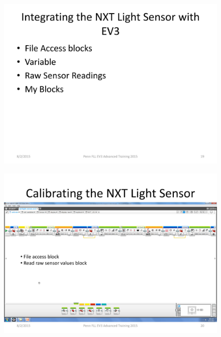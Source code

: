 \documentclass[11pt]{beamer}
\begin{document}
\begin{frame}
\begin{figure}
\includegraphics[scale=0.4]{ev3advanced2015/file-page19}
\end{figure}
\end{frame}


\begin{frame}
\begin{figure}
\includegraphics[scale=0.4]{ev3advanced2015/file-page20}
\end{figure}
\end{frame}
\end{document}
